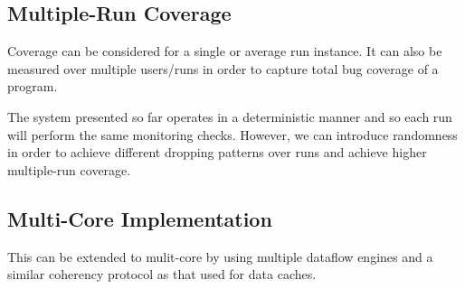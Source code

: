 \subsection{Multiple-Run Coverage}
Coverage can be considered for a single or average run instance. It can also be
measured over multiple users/runs in order to capture total bug coverage of a
program.

The system presented so far operates in a deterministic manner and so each run
will perform the same monitoring checks. However, we can introduce randomness
in order to achieve different dropping patterns over runs and achieve higher
multiple-run coverage.

\subsection{Multi-Core Implementation}

This can be extended to mulit-core by using multiple dataflow engines and a
similar coherency protocol as that used for data caches.
